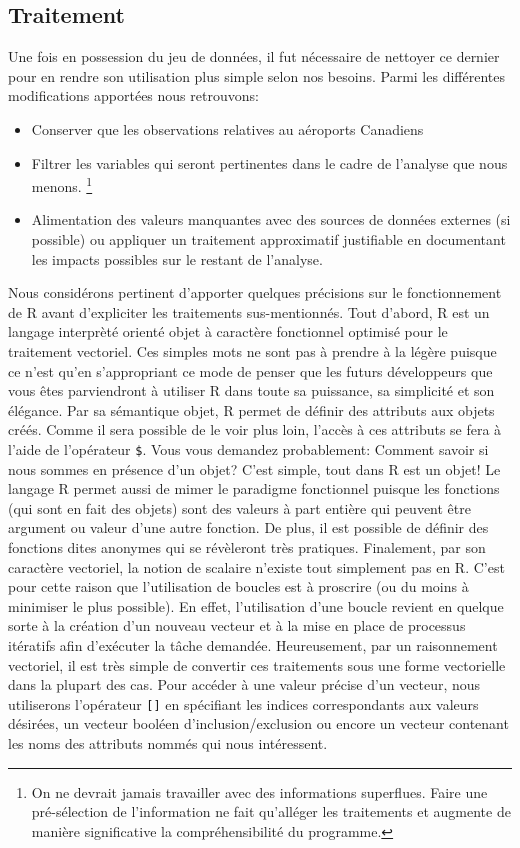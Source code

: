 \subsection{Traitement}
Une fois en possession du jeu de données, il fut nécessaire de nettoyer ce dernier pour en rendre son utilisation plus simple selon nos besoins. Parmi les différentes modifications apportées nous retrouvons: \\
\begin{itemize}
	\item Conserver que les observations relatives au aéroports Canadiens
	\item Filtrer les variables qui seront pertinentes dans le cadre de l'analyse que nous menons. 
		\footnote{On ne devrait jamais travailler avec des informations superflues. Faire une pré-sélection de l'information ne fait qu'alléger les traitements et augmente de manière significative la compréhensibilité du programme.}
	\item Alimentation des valeurs manquantes avec des sources de données externes (si possible) ou appliquer un traitement approximatif justifiable en documentant les impacts possibles sur le restant de l'analyse.
\end{itemize}
\vspace{\baselineskip}

\noindent
Nous considérons pertinent d'apporter quelques précisions sur le fonctionnement de R avant d'expliciter les traitements sus-mentionnés. Tout d'abord, R est un langage interprèté orienté objet à caractère fonctionnel optimisé pour le traitement vectoriel. Ces simples mots ne sont pas à prendre à la légère puisque ce n'est qu'en s'appropriant ce mode de penser que les futurs développeurs que vous êtes parviendront à utiliser R dans toute sa puissance, sa simplicité et son élégance. Par sa sémantique objet, R permet de définir des attributs aux objets créés. Comme il sera possible de le voir plus loin, l'accès à ces attributs se fera à l'aide de l'opérateur \texttt{\$}. Vous vous demandez probablement: Comment savoir si nous sommes en présence d'un objet? C'est simple, tout dans R est un objet! Le langage R permet aussi de mimer le paradigme fonctionnel puisque les fonctions (qui sont en fait des objets) sont des valeurs à part entière qui peuvent être argument ou valeur d'une autre fonction. De plus, il est possible de définir des fonctions dites anonymes qui se révèleront très pratiques. Finalement, par son caractère vectoriel, la notion de scalaire n'existe tout simplement pas en R. C'est pour cette raison que l'utilisation de boucles est à proscrire (ou du moins à minimiser le plus possible). En effet, l'utilisation d'une boucle revient en quelque sorte à la création d'un nouveau vecteur et à la mise en place de processus itératifs afin d'exécuter la tâche demandée. Heureusement, par un raisonnement vectoriel, il est très simple de convertir ces traitements sous une forme vectorielle dans la plupart des cas. \cite{Goulet} Pour accéder à une valeur précise d'un vecteur, nous utiliserons l'opérateur \texttt{[]} en spécifiant les indices correspondants aux valeurs désirées, un vecteur booléen d'inclusion/exclusion ou encore un vecteur contenant les noms des attributs nommés qui nous intéressent. \\

